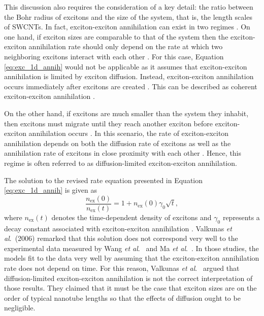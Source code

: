 This discussion also requires the consideration of a key detail: the ratio between the Bohr radius of excitons and the size of the system, that is, the length scales of SWCNTs. In fact, exciton-exciton annihilation can exist in two regimes \cite{valkunas2006exciton}. On one hand, if exciton sizes are comparable to that of the system then the exciton-exciton annihilation rate should only depend on the rate at which two neighboring excitons interact with each other \cite{valkunas2006exciton}. For this case, Equation \eqref{eq:exc_1d_annih} would not be applicable as it assumes that exciton-exciton annihilation is limited by exciton diffusion. Instead, exciton-exciton annihilation occurs immediately after excitons are created \cite{valkunas2006exciton}. This can be described as coherent exciton-exciton annihilation \cite{valkunas2006exciton}.

On the other hand, if excitons are much smaller than the system they inhabit, then excitons must migrate until they reach another exciton before exciton-exciton annihilation occurs \cite{valkunas2006exciton}. In this scenario, the rate of exciton-exciton annihilation depends on both the diffusion rate of excitons as well as the annihilation rate of excitons in close proximity with each other \cite{valkunas2006exciton}. Hence, this regime is often referred to as diffusion-limited exciton-exciton annihilation.

The solution to the revised rate equation presented in Equation \eqref{eq:exc_1d_annih} is given as
\begin{equation}
	\frac{n_\text{ex}(0)}{n_\text{ex}(t)} = 1 + n_\text{ex}(0) \gamma_0 \sqrt{t},
\end{equation}
where $n_\text{ex}(t)$ denotes the time-dependent density of excitons and $\gamma_0$ represents a decay constant associated with exciton-exciton annihilation \cite{valkunas2006exciton}. Valkunas \textit{et al}.\ (2006) \cite{valkunas2006exciton} remarked that this solution does not correspond very well to the experimental data measured by Wang \textit{et al}.\ \cite{wang2004observation} and Ma \textit{et al}.\ \cite{ma2004ultrafast, ma2005femtosecond}. In those studies, the models fit to the data very well by assuming that the exciton-exciton annihilation rate does not depend on time. For this reason, Valkunas \textit{et al}.\ \cite{valkunas2006exciton} argued that diffusion-limited exciton-exciton annihilation is not the correct interpretation of those results. They claimed that it must be the case that exciton sizes are on the order of typical nanotube lengths so that the effects of diffusion ought to be negligible.

